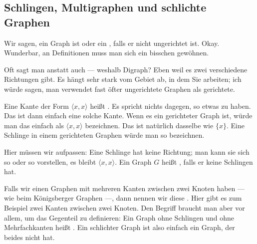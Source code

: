 \subsection{Schlingen, Multigraphen und schlichte Graphen}

\begin{spoken-clean}[00:22:54 - 00:25:30]
Wir sagen, ein Graph ist  oder ein , falls er nicht ungerichtet ist. Okay. Wunderbar, an Definitionen muss man sich ein bisschen gewöhnen.

Oft sagt man anstatt  auch  --- weshalb Digraph? Eben weil es zwei verschiedene Richtungen gibt. Es hängt sehr stark vom Gebiet ab, in dem Sie arbeiten; ich würde sagen, man verwendet fast öfter ungerichtete Graphen als gerichtete.

Eine Kante der Form $\langle x, x \rangle$ heißt . Es spricht nichts dagegen, so etwas zu haben. Das ist dann einfach eine solche Kante. Wenn es ein gerichteter Graph ist, würde man das einfach als $\langle x, x \rangle$ bezeichnen. Das ist natürlich dasselbe wie $\{x\}$. Eine Schlinge in einem gerichteten Graphen würde man so bezeichnen.

Hier müssen wir aufpassen: Eine Schlinge hat keine Richtung; man kann sie sich so oder so vorstellen, es bleibt $\langle x, x \rangle$. Ein Graph $G$ heißt , falls er keine Schlingen hat.

Falls wir einen Graphen mit mehreren Kanten zwischen zwei Knoten haben --- wie beim Königsberger Graphen ---, dann nennen wir diese . Hier gibt es zum Beispiel zwei Kanten zwischen zwei Knoten. Den Begriff braucht man aber vor allem, um das Gegenteil zu definieren: Ein Graph ohne Schlingen und ohne Mehrfachkanten heißt . Ein schlichter Graph ist also einfach ein Graph, der beides nicht hat.
\end{spoken-clean}

\begin{math-stroke}


\end{math-stroke}

